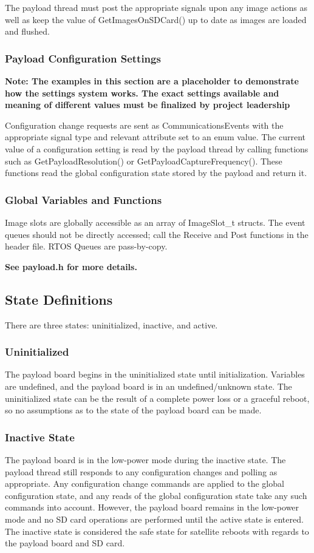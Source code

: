 \documentclass[10pt]{extarticle}
\begin{document}
The payload thread must post the appropriate signals upon any image actions
as well as keep the value of GetImagesOnSDCard() up to date as images are
loaded and flushed.

\subsubsection{Payload Configuration Settings}
{\bfseries Note: The examples in this section are a placeholder to demonstrate
how the settings system works. The exact settings available and meaning of
different values must be finalized by project leadership}

Configuration change requests are sent as CommunicationsEvents with the 
appropriate signal type and relevant attribute set to an enum value. The 
current value of a configuration setting is read by the payload thread by
calling functions such as GetPayloadResolution() or GetPayloadCaptureFrequency().
These functions read the global configuration state stored by the payload
and return it.

\subsubsection{Global Variables and Functions}
Image slots are globally accessible as an array of ImageSlot\_t structs. The
event queues should not be directly accessed; call the Receive and Post
functions in the header file. RTOS Queues are pass-by-copy.

{\bfseries See payload.h for more details.}

\subsection{State Definitions}
There are three states: uninitialized, inactive, and active.

\subsubsection{Uninitialized}
The payload board begins in the uninitialized state until initialization.
Variables are undefined, and the payload board is in an undefined/unknown state.
The uninitialized state can be the result of a complete power loss or a graceful
reboot, so no assumptions as to the state of the payload board can be made.

\subsubsection{Inactive State}
The payload board is in the low-power mode during the inactive state. The
payload thread still responds to any configuration changes and polling as
appropriate. Any configuration change commands are applied to the global
configuration state, and any reads of the global configuration state take any
such
commands into account. However, the payload board remains in the low-power mode
and no SD card operations are performed until the active state is entered. The
inactive state is considered the safe state for satellite reboots with regards
to the payload board and SD card.
\end{document}
